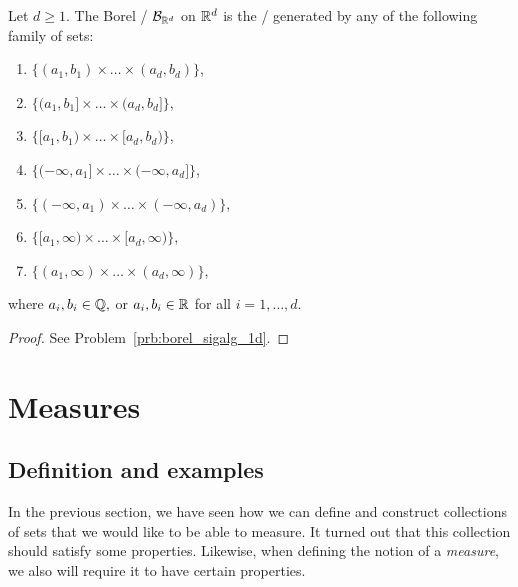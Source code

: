 \begin{proposition}\label{prop:characterization_borel_sigalg}
Let $d \ge 1$. The Borel \sigalg/ $\mathcal B_{\mathbb R^d}$ on $\mathbb R^d$ is the \sigalg/ generated by any of the following family of sets:
\begin{enumerate}[label={(\alph*)}]
\item $\{(a_1, b_1) \times \dots \times (a_d,b_d)\}$,
\item $\{(a_1, b_1] \times \dots \times (a_d,b_d]\}$,
\item $\{[a_1, b_1) \times \dots \times [a_d,b_d)\}$,
\item $\{(-\infty,a_1] \times \dots \times (-\infty,a_d]\}$,
\item $\{(-\infty,a_1) \times \dots \times (-\infty, a_d)\}$,
\item $\{[a_1, \infty) \times \dots \times [a_d, \infty)\}$,
\item $\{(a_1,\infty) \times \dots \times (a_d, \infty)\}$,
\end{enumerate}
where $a_i, b_i \in \mathbb Q,$ or $a_i, b_i \in \mathbb R$ for all $i = 1, \dots, d$.


\end{proposition}

\begin{proof}
See Problem~\ref{prb:borel_sigalg_1d}.
\end{proof}


\section{Measures}

\subsection{Definition and examples}
In the previous section, we have seen how we can define and construct collections of sets that we would like to be able to measure. It turned out that this collection should satisfy some properties. Likewise, when defining the notion of a \emph{measure}, we also will require it to have certain properties.

